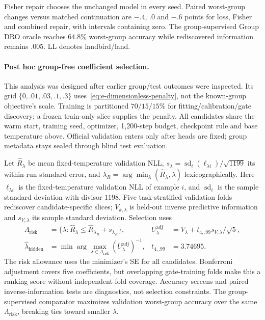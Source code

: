 Fisher repair chooses the unchanged model in every seed. Paired worst-group changes versus matched continuation are $-.4$, $.0$ and $-.6$ points for loss, Fisher and combined repair, with intervals containing zero. The group-supervised Group DRO oracle reaches $64.8\%$ worst-group accuracy while rediscovered information remains $.005$. LL denotes landbird/land.

\paragraph{Post hoc group-free coefficient selection.}
This analysis was designed after earlier group/test outcomes were inspected. Its grid $\{0,.01,.03,.1,.3\}$ uses~\eqref{eq:e-dimensionless-penalty}, not the known-group objective's scale. Training is partitioned $70/15/15\%$ for fitting/calibration/gate discovery; a frozen train-only slice supplies the penalty. All candidates share the warm start, training seed, optimizer, 1,200-step budget, checkpoint rule and base temperature above. Official validation enters only after heads are fixed; group metadata stays sealed through blind test evaluation.

Let $\widehat R_\lambda$ be mean fixed-temperature validation NLL, $s_\lambda=\operatorname{sd}_i(\ell_{\lambda i})/\sqrt{1199}$ its within-run standard error, and $\lambda_R=\arg\min_\lambda(\widehat R_\lambda,\lambda)$ lexicographically. Here $\ell_{\lambda i}$ is the fixed-temperature validation NLL of example $i$, and $\operatorname{sd}_i$ is the sample standard deviation with divisor $1198$. Five task-stratified validation folds rediscover candidate-specific slices; $V_{k,\lambda}$ is held-out inverse predictive information and $s_{V,\lambda}$ its sample standard deviation. Selection uses
\begin{equation}
\begin{aligned}
\Lambda_{\mathrm{risk}}&=\{\lambda:\widehat R_\lambda\le\widehat R_{\lambda_R}+s_{\lambda_R}\},&
U_\lambda^{\mathrm{adj}}&=\overline V_\lambda+t_{4,.99}s_{V,\lambda}/\sqrt5,\\
\widehat\lambda_{\mathrm{hidden}}
&=\min\arg\max_{\lambda\in\Lambda_{\mathrm{risk}}}(U_\lambda^{\mathrm{adj}})^{-1},&
t_{4,.99}&=3.74695 .
\end{aligned}
\end{equation}
The risk allowance uses the minimizer's SE for all candidates. Bonferroni adjustment covers five coefficients, but overlapping gate-training folds make this a ranking score without independent-fold coverage. Accuracy screens and paired inverse-information tests are diagnostics, not selection constraints. The group-supervised comparator maximizes validation worst-group accuracy over the same $\Lambda_{\mathrm{risk}}$, breaking ties toward smaller $\lambda$.

